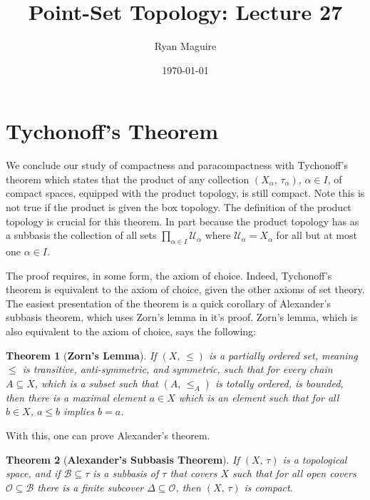 \documentclass{article}
\title{Point-Set Topology: Lecture 27}
\author{Ryan Maguire}
\date{\today}
\theoremstyle{plain}
\newtheorem{theorem}{Theorem}[section]
\begin{document}
    \maketitle
    \section{Tychonoff's Theorem}
        We conclude our study of compactness and paracompactness with
        Tychonoff's theorem which states that the product of any collection
        $(X_{\alpha},\,\tau_{\alpha})$, $\alpha\in{I}$, of
        compact spaces, equipped with the product topology, is still compact.
        Note this is not true if the product is given the box topology. The
        definition of the product topology is crucial for this theorem. In part
        because the product topology has as a subbasis the collection of all
        sets $\prod_{\alpha\in{I}}\mathcal{U}_{\alpha}$ where
        $\mathcal{U}_{\alpha}=X_{\alpha}$ for all but at most one
        $\alpha\in{I}$.
        \par\hfill\par
        The proof requires, in some form, the axiom of choice.
        Indeed, Tychonoff's theorem is equivalent to the axiom of choice, given
        the other axioms of set theory. The easiest presentation of the
        theorem is a quick corollary of Alexander's subbasis theorem, which
        uses Zorn's lemma in it's proof. Zorn's lemma, which is also equivalent
        to the axiom of choice, says the following:
        \begin{theorem}[\textbf{Zorn's Lemma}]
            If $(X,\,\leq)$ is a partially ordered set, meaning
            $\leq$ is transitive, anti-symmetric, and symmetric, such that
            for every chain $A\subseteq{X}$, which is a subset such that
            $(A,\,\leq_{A})$ is totally ordered, is bounded, then there is a
            maximal element $a\in{X}$ which is an element such that for all
            $b\in{X}$, $a\leq{b}$ implies $b=a$.
        \end{theorem}
        With this, one can prove Alexander's theorem.
        \begin{theorem}[\textbf{Alexander's Subbasis Theorem}]
            If $(X,\,\tau)$ is a topological space, and if
            $\mathcal{B}\subseteq\tau$ is a subbasis of $\tau$ that covers $X$
            such that for all open covers $\mathcal{O}\subseteq\mathcal{B}$
            there is a finite subcover $\Delta\subseteq\mathcal{O}$, then
            $(X,\,\tau)$ is compact.
        \end{theorem}
\end{document}
